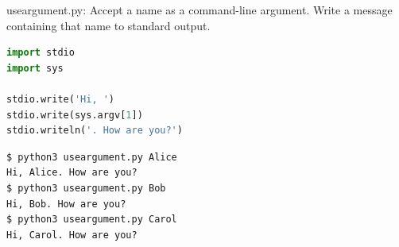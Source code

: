 \documentclass[8pt,a4paper,compress]{beamer}
\begin{document}
\begin{frame}[fragile]
\pause

\begin{framed}
\tiny useargument.py: Accept a name as a command-line argument. Write a message containing that name to standard output.
\end{framed}

\begin{lstlisting}[language=Python]
import stdio
import sys

stdio.write('Hi, ')
stdio.write(sys.argv[1])
stdio.writeln('. How are you?')
\end{lstlisting}

\pause
\begin{lstlisting}[language={}]
$ python3 useargument.py Alice
Hi, Alice. How are you?
$ python3 useargument.py Bob
Hi, Bob. How are you?
$ python3 useargument.py Carol
Hi, Carol. How are you?
\end{lstlisting}
\end{frame}
\end{document}
